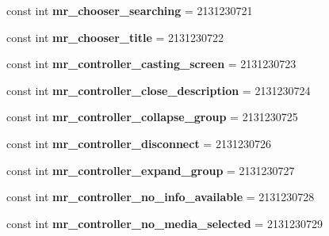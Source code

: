 \begin{DoxyCompactItemize}
\mbox{\label{classXaria_1_1Resource_1_1String_a67115cd0437cf3654cd0eadb9c94d31c}} 
const int {\bfseries mr\+\_\+chooser\+\_\+searching} = 2131230721
\item 
\mbox{\label{classXaria_1_1Resource_1_1String_a51ea47c364c066142146623a565ff766}} 
const int {\bfseries mr\+\_\+chooser\+\_\+title} = 2131230722
\item 
\mbox{\label{classXaria_1_1Resource_1_1String_a5d93551ce0e5683c61819b8341eb9cc4}} 
const int {\bfseries mr\+\_\+controller\+\_\+casting\+\_\+screen} = 2131230723
\item 
\mbox{\label{classXaria_1_1Resource_1_1String_aafec1716febe9075ab255db20ea5f892}} 
const int {\bfseries mr\+\_\+controller\+\_\+close\+\_\+description} = 2131230724
\item 
\mbox{\label{classXaria_1_1Resource_1_1String_a3e0c7eacee12c2ae3e1c2c518edb55d1}} 
const int {\bfseries mr\+\_\+controller\+\_\+collapse\+\_\+group} = 2131230725
\item 
\mbox{\label{classXaria_1_1Resource_1_1String_a3f183e9e48ecfe3c48ce72d43b69862d}} 
const int {\bfseries mr\+\_\+controller\+\_\+disconnect} = 2131230726
\item 
\mbox{\label{classXaria_1_1Resource_1_1String_af8a551445500c2b219b8afff45db9c46}} 
const int {\bfseries mr\+\_\+controller\+\_\+expand\+\_\+group} = 2131230727
\item 
\mbox{\label{classXaria_1_1Resource_1_1String_a4ee92fadd3cb2156423c8ef99478fd2a}} 
const int {\bfseries mr\+\_\+controller\+\_\+no\+\_\+info\+\_\+available} = 2131230728
\item 
\mbox{\label{classXaria_1_1Resource_1_1String_ab5bbd71be99ceb27e47edfd726734ecb}} 
const int {\bfseries mr\+\_\+controller\+\_\+no\+\_\+media\+\_\+selected} = 2131230729
\item 
\mbox{\label{classXaria_1_1Resource_1_1String_a33cdb211e81290072f71742d9fa1c4e9}} 

\end{DoxyCompactItemize}
